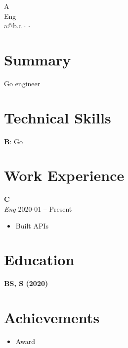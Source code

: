 \documentclass[11pt]{article}
\begin{document}
{\LARGE A}\\
{\large Eng}\\
a@b.c $\cdot$  $\cdot$ \\

\section*{Summary}
Go engineer

\section*{Technical Skills}
\textbf{B}: Go\\

\section*{Work Experience}
\textbf{C} \hfill \\
\textit{Eng} \hfill 2020-01 -- Present\\
\begin{itemize}
\item Built APIs
\end{itemize}

\section*{Education}
\textbf{BS, S (2020)}\\

\section*{Achievements}
\begin{itemize}
\item Award
\end{itemize}
\end{document}
